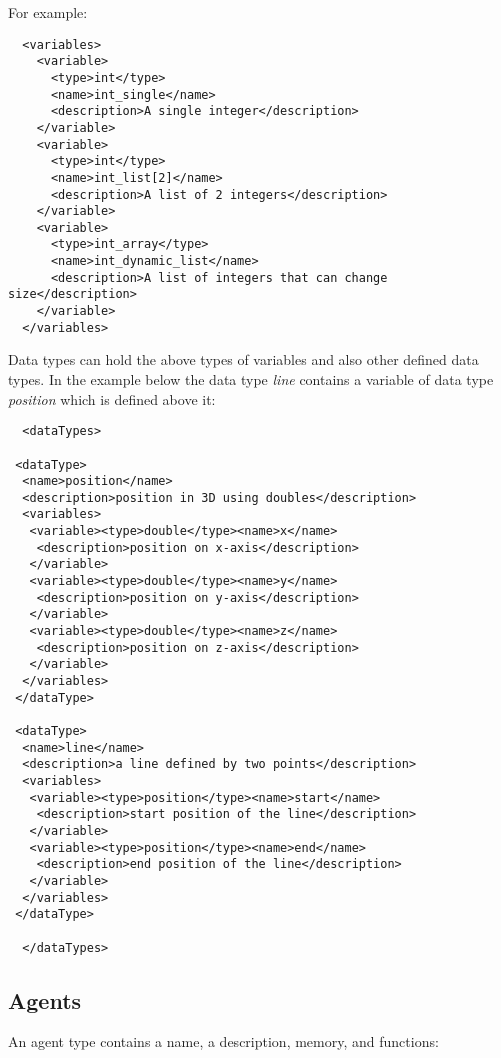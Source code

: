 For example:

\begin{verbatim}
  <variables>
    <variable>
      <type>int</type>
      <name>int_single</name>
      <description>A single integer</description>
    </variable>
    <variable>
      <type>int</type>
      <name>int_list[2]</name>
      <description>A list of 2 integers</description>
    </variable>
    <variable>
      <type>int_array</type>
      <name>int_dynamic_list</name>
      <description>A list of integers that can change size</description>
    </variable>
  </variables>
\end{verbatim}

Data types can hold the above types of variables and also other defined data
types. In the example below the data type \emph{line} contains a variable
of data type \emph{position} which is defined above it:

\begin{verbatim}
  <dataTypes>

 <dataType>
  <name>position</name>
  <description>position in 3D using doubles</description>
  <variables>
   <variable><type>double</type><name>x</name>
    <description>position on x-axis</description>
   </variable>
   <variable><type>double</type><name>y</name>
    <description>position on y-axis</description>
   </variable>
   <variable><type>double</type><name>z</name>
    <description>position on z-axis</description>
   </variable>
  </variables>
 </dataType>

 <dataType>
  <name>line</name>
  <description>a line defined by two points</description>
  <variables>
   <variable><type>position</type><name>start</name>
    <description>start position of the line</description>
   </variable>
   <variable><type>position</type><name>end</name>
    <description>end position of the line</description>
   </variable>
  </variables>
 </dataType>

  </dataTypes>
\end{verbatim}

\subsection{Agents}

An agent type contains a name, a description, memory, and functions:

